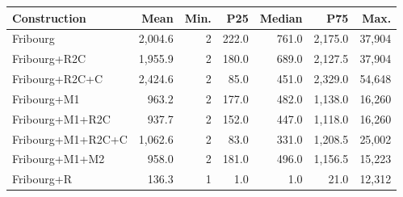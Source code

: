 \begin{tabular}{lrrrrrr}
  \hline
Construction & Mean & Min. & P25 & Median & P75 & Max. \\ 
  \hline
Fribourg & 2,004.6 & 2 & 222.0 & 761.0 & 2,175.0 & 37,904 \\ 
  Fribourg+R2C & 1,955.9 & 2 & 180.0 & 689.0 & 2,127.5 & 37,904 \\ 
  Fribourg+R2C+C & 2,424.6 & 2 & 85.0 & 451.0 & 2,329.0 & 54,648 \\ 
  Fribourg+M1 & 963.2 & 2 & 177.0 & 482.0 & 1,138.0 & 16,260 \\ 
  Fribourg+M1+R2C & 937.7 & 2 & 152.0 & 447.0 & 1,118.0 & 16,260 \\ 
  Fribourg+M1+R2C+C & 1,062.6 & 2 & 83.0 & 331.0 & 1,208.5 & 25,002 \\ 
  Fribourg+M1+M2 & 958.0 & 2 & 181.0 & 496.0 & 1,156.5 & 15,223 \\ 
  Fribourg+R & 136.3 & 1 & 1.0 & 1.0 & 21.0 & 12,312 \\ 
   \hline
\end{tabular}

